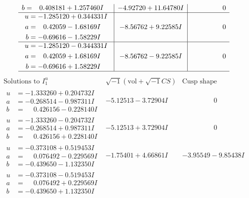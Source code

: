 \documentclass[1p]{elsarticle_modified}
\theoremstyle{definition}
\newcommand{\I}{\sqrt{-1}}
\begin{document}
$$\begin{array}{c|c|c}
\begin{aligned}
b &= \phantom{-}0.408181 + 1.257460 I\end{aligned}
 & -4.92720 + 11.64780 I & \phantom{-0.000000 } 0 \\ \hline\begin{aligned}
u &= -1.285120 + 0.344331 I \\
a &= \phantom{-}0.42059 - 1.68169 I \\
b &= -0.69616 - 1.58229 I\end{aligned}
 & -8.56762 + 9.22585 I & \phantom{-0.000000 } 0 \\ \hline\begin{aligned}
u &= -1.285120 - 0.344331 I \\
a &= \phantom{-}0.42059 + 1.68169 I \\
b &= -0.69616 + 1.58229 I\end{aligned}
 & -8.56762 - 9.22585 I & \phantom{-0.000000 } 0\\
 \hline 
 \end{array}$$\newpage$$\begin{array}{c|c|c}  
\text{Solutions to }I^u_{1}& \I (\text{vol} + \sqrt{-1}CS) & \text{Cusp shape}\\
 \hline 
\begin{aligned}
u &= -1.333260 + 0.204732 I \\
a &= -0.268514 - 0.987311 I \\
b &= \phantom{-}0.426156 - 0.228140 I\end{aligned}
 & -5.12513 - 3.72904 I & \phantom{-0.000000 } 0 \\ \hline\begin{aligned}
u &= -1.333260 - 0.204732 I \\
a &= -0.268514 + 0.987311 I \\
b &= \phantom{-}0.426156 + 0.228140 I\end{aligned}
 & -5.12513 + 3.72904 I & \phantom{-0.000000 } 0 \\ \hline\begin{aligned}
u &= -0.373108 + 0.519453 I \\
a &= \phantom{-}0.076492 - 0.229569 I \\
b &= -0.439650 - 1.132350 I\end{aligned}
 & -1.75401 + 4.66861 I & -3.95549 - 9.85438 I \\ \hline\begin{aligned}
u &= -0.373108 - 0.519453 I \\
a &= \phantom{-}0.076492 + 0.229569 I \\
b &= -0.439650 + 1.132350 I\end{aligned}

\end{array}$$
\end{document}
